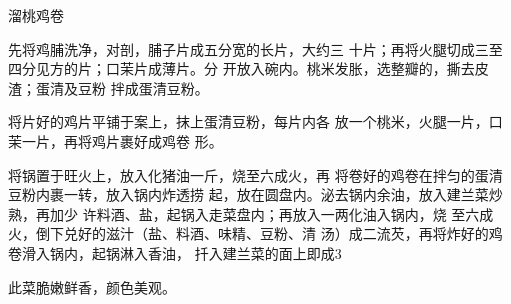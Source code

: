 \begin{recipe}{溜桃鸡卷}

\ingredients





\cooking

先将鸡脯洗净，对剖，脯子片成五分宽的长片，大约三 十片；再将火腿切成三至四分见方的片；口茉片成薄片。分 开放入碗内。桃米发胀，选整瓣的，撕去皮渣；蛋清及豆粉 拌成蛋清豆粉。

\step 将片好的鸡片平铺于案上，抹上蛋清豆粉，每片内各 放一个桃米，火腿一片，口茉一片，再将鸡片裹好成鸡卷 形。

\step 将锅置于旺火上，放入化猪油一斤，烧至六成火，再 将卷好的鸡卷在拌匀的蛋清豆粉内裹一转，放入锅内炸透捞 起，放在圆盘内。泌去锅内余油，放入建兰菜炒熟，再加少 许料酒、盐，起锅入走菜盘内；再放入一两化油入锅内，烧 至六成火，倒下兑好的滋汁（盐、料酒、味精、豆粉、清 汤）成二流芡，再将炸好的鸡卷滑入锅内，起锅淋入香油， 扦入建兰菜的面上即成3

\notes

此菜脆嫩鲜香，颜色美观。

\end{recipe}

